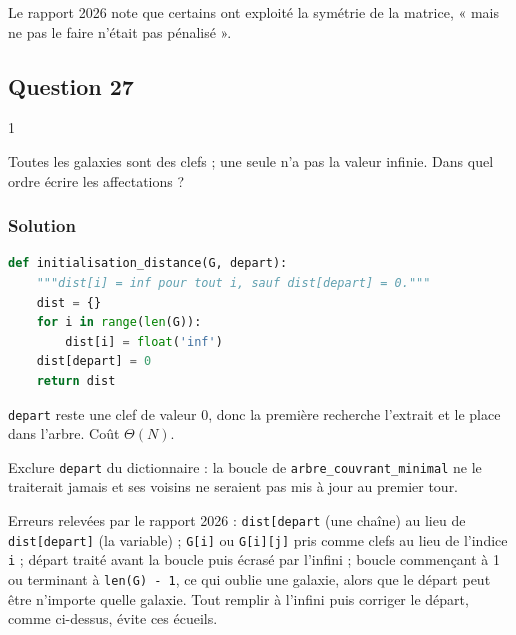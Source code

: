 \documentclass[11pt,a4paper]{article}
\begin{document}
\begin{jury}

Le rapport 2026 note que certains ont exploité la symétrie de la matrice, « mais ne pas le faire n'était pas pénalisé ».

\end{jury}

\hypertarget{question-27}{%
\subsection{Question 27}\label{question-27}}

\begin{indication}{1}

Toutes les galaxies sont des clefs ; une seule n'a pas la valeur infinie. Dans quel ordre écrire les affectations ?

\end{indication}

\hypertarget{solution-26}{%
\subsubsection{Solution}\label{solution-26}}

\begin{lstlisting}[language=Python]
def initialisation_distance(G, depart):
    """dist[i] = inf pour tout i, sauf dist[depart] = 0."""
    dist = {}
    for i in range(len(G)):
        dist[i] = float('inf')
    dist[depart] = 0
    return dist
\end{lstlisting}

\texttt{depart} reste une clef de valeur \(0\), donc la première recherche l'extrait et le place dans l'arbre. Coût \(\Theta(N)\).

\begin{piege}

Exclure \texttt{depart} du dictionnaire : la boucle de \texttt{arbre\_couvrant\_minimal} ne le traiterait jamais et ses voisins ne seraient pas mis à jour au premier tour.

\end{piege}

\begin{piege}

Erreurs relevées par le rapport 2026 : \texttt{dist{[}\textquotesingle{}depart\textquotesingle{}{]}} (une chaîne) au lieu de \texttt{dist{[}depart{]}} (la variable) ; \texttt{G{[}i{]}} ou \texttt{G{[}i{]}{[}j{]}} pris comme clefs au lieu de l'indice \texttt{i} ; départ traité avant la boucle puis écrasé par l'infini ; boucle commençant à 1 ou terminant à \texttt{len(G)\ -\ 1}, ce qui oublie une galaxie, alors que le départ peut être n'importe quelle galaxie. Tout remplir à l'infini puis corriger le départ, comme ci-dessus, évite ces écueils.

\end{piege}
\end{document}
